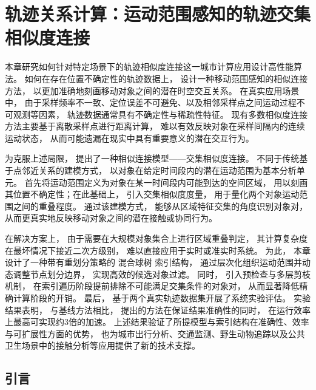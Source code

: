 \chapter{轨迹关系计算：运动范围感知的轨迹交集相似度连接}
\label{cha:join}
本章研究如何针对特定场景下的轨迹相似度连接这一城市计算应用设计高性能算法。 如何在存在位置不确定性的轨迹数据上， 设计一种移动范围感知的相似连接方法， 以更加准确地刻画移动对象之间的潜在时空交互关系。 在真实应用场景中， 由于采样频率不一致、定位误差不可避免、以及相邻采样点之间运动过程不可观测等因素， 轨迹数据通常具有不确定性与稀疏性特征。 现有多数相似度连接方法主要基于离散采样点进行距离计算， 难以有效反映对象在采样间隔内的连续运动状态， 从而可能遗漏在现实中具有重要意义的潜在交互行为。

为克服上述局限， 提出了一种相似连接模型——交集相似度连接。 不同于传统基于点邻近关系的建模方式， 以对象在给定时间段内的潜在运动范围为基本分析单元。 首先将运动范围定义为对象在某一时间段内可能到达的空间区域， 用以刻画其位置不确定性；在此基础上， 引入交集相似度度量， 用于量化两个对象运动范围之间的重叠程度。 通过该建模方式， 能够从区域特征交集的角度识别对象对， 从而更真实地反映移动对象之间的潜在接触或协同行为。




在解决方案上， 由于需要在大规模对象集合上进行区域重叠判定， 其计算复杂度在最坏情况下接近二次方级别， 难以直接应用于实时或准实时系统。 为此， 本章设计了一种带有重划分策略的 混合球树 索引结构， 通过层次化组织运动范围并动态调整节点划分边界， 实现高效的候选对象过滤。 同时， 引入预检查与多层剪枝机制， 在索引遍历阶段提前排除不可能满足交集条件的对象对， 从而显著降低精确计算阶段的开销。 最后， 基于两个真实轨迹数据集开展了系统实验评估。 实验结果表明， 与基线方法相比， 提出的方法在保证结果准确性的同时， 在运行效率上最高可实现约3倍的加速。 上述结果验证了所提模型与索引结构在准确性、效率与可扩展性方面的优势， 也为城市出行分析、交通监测、野生动物追踪以及公共卫生场景中的接触分析等应用提供了新的技术支撑。
\section{引言}


